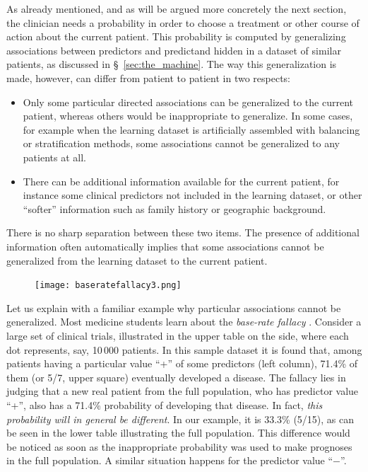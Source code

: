 \documentclass[utf8]{FrontiersinHarvard} %
\newcommand*{\sect}{\S}%
\renewcommand*{\|}[1][]{\nonscript\:#1\vert\nonscript\:\mathopen{}}
\begin{document}
As already mentioned, and as will be argued more concretely the next section, the clinician needs a probability in order to choose a treatment or other course of action about the current patient. This probability is computed by generalizing associations between predictors and predictand hidden in a dataset of similar patients, as discussed in \sect~\ref{sec:the_machine}. The way this generalization is made, however, can differ from patient to patient in two respects:
\begin{itemize}
\item Only some particular directed associations can be generalized to the current patient, whereas others would be inappropriate to generalize. In some cases, for example when the learning dataset is artificially assembled with balancing or stratification methods, some associations cannot be generalized to any patients at all.
\item There can be additional information available for the current patient, for instance some clinical predictors not included in the learning dataset, or other \enquote{softer} information such as family history or geographic background.
\end{itemize}
There is no sharp separation between these two items. The presence of additional information often automatically implies that some associations cannot be generalized from the learning dataset to the current patient.


\setlength{\intextsep}{0ex}%
\setlength{\columnsep}{1ex}%
\begin{figure}%
\texttt{[image: baseratefallacy3.png]}%
\end{figure}%
Let us explain with a familiar example why particular associations cannot be generalized. Most medicine students learn about the \emph{base-rate fallacy} \citep{barhillel1980,jennyetal2018,sprengeretal2021,matthews1996}. Consider a large set of clinical trials, illustrated in the upper table on the side, where each dot represents, say, 10\,000 patients. In this sample dataset it is found that, among patients having a particular value \enquote{+} of some predictors (left column), 71.4\% of them (or 5/7, upper square) eventually developed a disease. The fallacy lies in judging that a new real patient from the full population, who has predictor value \enquote{+}, also has a 71.4\% probability of developing that disease. In fact, \emph{this probability will in general be different}. In our example, it is 33.3\% (5/15), as can be seen in the lower table illustrating the full population. This difference would be noticed as soon as the inappropriate probability was used to make prognoses in the full population. A similar situation happens for the predictor value \enquote{$-$}.
\end{document}
